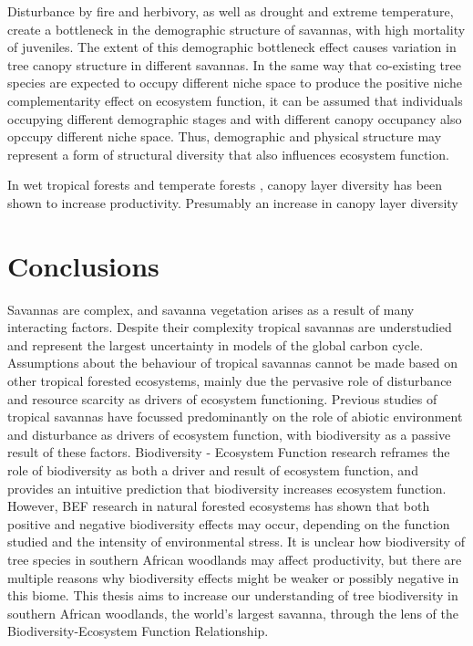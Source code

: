 \begin{refsection}
Disturbance by fire and herbivory, as well as drought and extreme temperature, create a bottleneck in the demographic structure of savannas, with high mortality of juveniles. The extent of this demographic bottleneck effect causes variation in tree canopy structure in different savannas. In the same way that co-existing tree species are expected to occupy different niche space to produce the positive niche complementarity effect on ecosystem function, it can be assumed that individuals occupying different demographic stages and with different canopy occupancy also opccupy different niche space. Thus, demographic and physical structure may represent a form of structural diversity that also influences ecosystem function.

In wet tropical forests \citep{} and temperate forests \citep{Danescu2016}, canopy layer diversity has been shown to increase productivity. Presumably an increase in canopy layer diversity 

\section{Conclusions}
\label{background:sec:conclusion}

Savannas are complex, and savanna vegetation arises as a result of many interacting factors. Despite their complexity tropical savannas are understudied and represent the largest uncertainty in models of the global carbon cycle. Assumptions about the behaviour of tropical savannas cannot be made based on other tropical forested ecosystems, mainly due the pervasive role of disturbance and resource scarcity as drivers of ecosystem functioning. Previous studies of tropical savannas have focussed predominantly on the role of abiotic environment and disturbance as drivers of ecosystem function, with biodiversity as a passive result of these factors. Biodiversity - Ecosystem Function research reframes the role of biodiversity as both a driver and result of ecosystem function, and provides an intuitive prediction that biodiversity increases ecosystem function. However, BEF research in natural forested ecosystems has shown that both positive and negative biodiversity effects may occur, depending on the function studied and the intensity of environmental stress. It is unclear how biodiversity of tree species in southern African woodlands may affect productivity, but there are multiple reasons why biodiversity effects might be weaker or possibly negative in this biome. This thesis aims to increase our understanding of tree biodiversity in southern African woodlands, the world's largest savanna, through the lens of the Biodiversity-Ecosystem Function Relationship.

\newpage{}
\begingroup
{}
\printbibliography[heading=subbibintoc]
\endgroup

\end{refsection}

